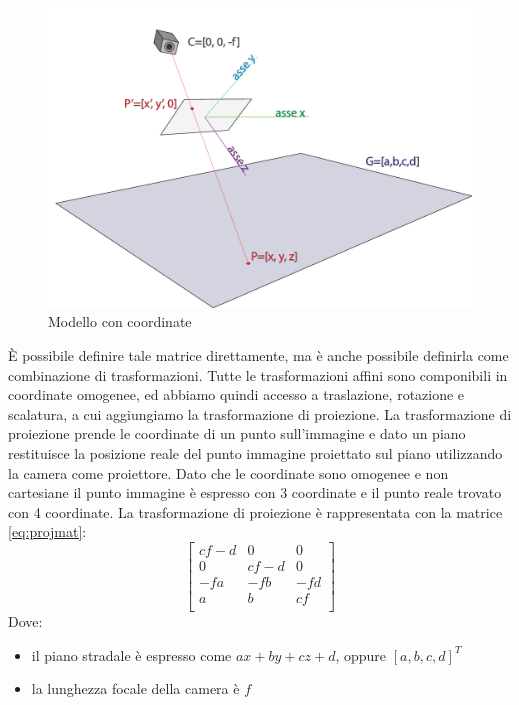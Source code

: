 \begin{figure}
    \caption{Modello con coordinate}
    \label{fig:camera coords}
    \centering
    \includegraphics[width=\textwidth]{images/camera coords.pdf}
\end{figure}

È possibile definire tale matrice direttamente, ma è anche possibile definirla come combinazione di trasformazioni.
Tutte le trasformazioni affini sono componibili in coordinate omogenee, ed abbiamo quindi accesso a traslazione, rotazione e scalatura, a cui aggiungiamo la trasformazione di proiezione.
La trasformazione di proiezione prende le coordinate di un punto sull'immagine e dato un piano restituisce la posizione reale del punto immagine proiettato sul piano utilizzando la camera come proiettore.
Dato che le coordinate sono omogenee e non cartesiane il punto immagine è espresso con 3 coordinate e il punto reale trovato con 4 coordinate.
La trasformazione di proiezione è rappresentata con la matrice \ref{eq:projmat}:
\begin{equation}
    \label{eq:projmat}
    \begin{bmatrix}
        cf - d & 0      & 0   \\
        0      & cf - d & 0   \\
        -fa    & -fb    & -fd \\
        a      & b      & cf  \\
    \end{bmatrix}
\end{equation}
Dove:
\begin{itemize}
    \item il piano stradale è espresso come $ax + by + cz + d$, oppure $[a, b, c, d]^T$
    \item la lunghezza focale della camera è $f$
\end{itemize}

